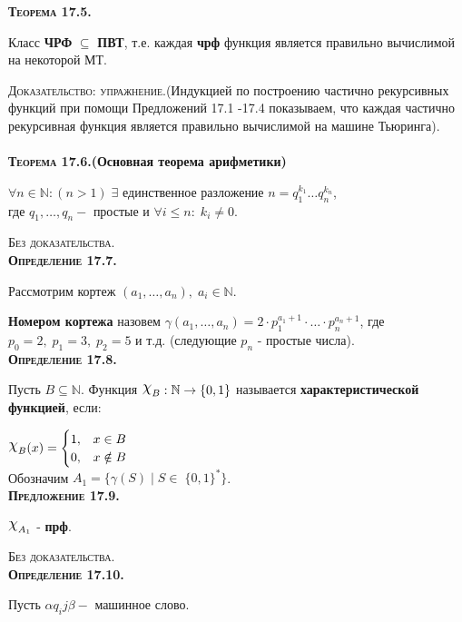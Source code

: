 \documentclass[18pt, a4paper]{extarticle}
\newcommand{\al}{\alpha}
\newcommand{\dokup}{\textsc{Доказательство: упражнение.}}
\newcommand{\bezdok}{\textsc{Без доказательства.}}
\begin{document}
\textbf{\textsc{Теорема 17.5.}} 

Класс \textbf{ЧРФ} $\subseteq$ \textbf{ПВТ}, т.е. каждая \textbf{чрф} функция является правильно вычислимой на некоторой МТ.

\dokup \;(Индукцией по построению частично рекурсивных
функций при помощи Предложений 17.1 -17.4 показываем, что каждая частично
рекурсивная функция является правильно вычислимой на машине Тьюринга).\\\\

\textbf{\textsc{Теорема 17.6.}(Основная теорема арифметики)}

$\forall n\in\mathbb N:(n>1)\;\exists$ единственное разложение $n=q_1^{k_1}\dots q_n^{k_n}$, \\где $q_1,\dots,q_n-$ простые и $\forall i\leqslant n:\;k_i\neq0$.

\bezdok\\

\textbf{\textsc{Определение 17.7.}} 

Рассмотрим кортеж $(a_1,\dots,a_n),\;a_i\in\mathbb N$.

\textbf{Номером кортежа} назовем $\gamma(a_1,\dots,a_n)=2\cdot p_1^{a_1+1}\cdot\dotso\cdot p_n^{a_n+1}$, где\\
$p_0=2,\;p_1=3,\;p_2=5$ и т.д. (следующие $p_n$ - простые числа).\\

\textbf{\textsc{Определение 17.8.}} 

Пусть $B\subseteq\mathbb N$. Функция $\raisebox{.5ex}{\scalebox{1.2}{$\chi$}}_B:\mathbb N\to\{0,1\}$ называется \textbf{характеристической функцией}, если:

$\raisebox{.5ex}{\scalebox{1.2}{$\chi$}}_{B}(x)=
\begin{cases}
   1, &\text{$x\in B$}\\
   0, &\text{$x\notin B$}
\end{cases}$\\

Обозначим $A_1=\{\gamma(S)\;|\;S\in\;\{0,1\}^*\}$.\\

\textbf{\textsc{Предложение 17.9.}} 

$\raisebox{.5ex}{\scalebox{1.2}{$\chi$}}_{A_1}$ -  \textbf{прф}.

\bezdok\\

\textbf{\textsc{Определение 17.10.}} 

Пусть $\al q_i j\beta-$ машинное слово. 
\end{document}
